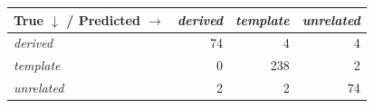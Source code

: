 \begin{tabular}{lrrr}
\toprule
True $\downarrow$ / Predicted $\rightarrow$ & \textit{derived} & \textit{template} & \textit{unrelated} \\
\midrule
\textit{derived} & 74 & 4 & 4 \\
\textit{template} & 0 & 238 & 2 \\
\textit{unrelated} & 2 & 2 & 74 \\
\bottomrule
\end{tabular}
